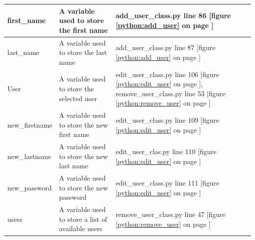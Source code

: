 \begin{center}
\begin{tabular}{|p{4cm}|p{4.5cm}|p{4.5cm}|}
	first\_name & A variable used to store the first name & add\_user\_class.py line 86 [figure \ref{python:add_user} on page \pageref{python:add_user}] \\ \hline
	last\_name & A variable used to store the last name & add\_user\_class.py line 87 [figure \ref{python:add_user} on page \pageref{python:add_user}] \\ \hline
	User & A variable used to store the selected user & edit\_user\_class.py line 106 [figure \ref{python:edit_user} on page \pageref{python:edit_user}], remove\_user\_class.py line 53 [figure \ref{python:remove_user} on page \pageref{python:remove_user}] \\ \hline
	new\_firstname & A variable used to store the new first name & edit\_user\_class.py line 109 [figure \ref{python:edit_user} on page \pageref{python:edit_user}] \\ \hline
	new\_lastname & A variable used to store the new last name & edit\_user\_clas.py line 110 [figure \ref{python:edit_user} on page \pageref{python:edit_user}] \\ \hline
	new\_password & A variable used to store the new password & edit\_user\_class.py line 111 [figure \ref{python:edit_user} on page \pageref{python:edit_user}] \\ \hline
	users & A variable used to store a list of available users & remove\_user\_class.py line 47 [figure \ref{python:remove_user} on page \pageref{python:remove_user}] \\ \hline
	\end{tabular}
	

\end{center}
